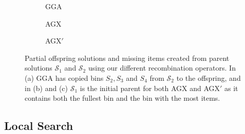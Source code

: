 \documentclass[a4paper,11pt,authoryear]{elsarticle}
\begin{document}
\begin{figure}[h!]	
	\centering
	\begin{subfigure}[h]{0.3\textwidth}
		
		\caption{GGA}
		\label{fig:gga}
	\end{subfigure} \hspace{5mm}
	\begin{subfigure}[h]{0.3\textwidth}
		
		\caption{AGX}
		\label{fig:agx}
	\end{subfigure} \hspace{5mm}
	\begin{subfigure}[h]{0.3\textwidth}
		
		\caption{AGX$'$}
		\label{fig:agxdash}
	\end{subfigure}
	\caption{Partial offspring solutions and missing items created from parent solutions $\mathcal{S}_1$ and $\mathcal{S}_2$ using our different recombination operators. In (a) GGA has copied bins $S_2, S_3$ and $S_4$ from $\mathcal{S}_2$ to the offspring, and in (b) and (c) $\mathcal{S}_1$ is the initial parent for both AGX and AGX$'$ as it contains both the fullest bin and the bin with the most items.}
	\label{fig:recomb}
\end{figure}

\subsection{Local Search}
\label{sub:localsearch}
\end{document}
